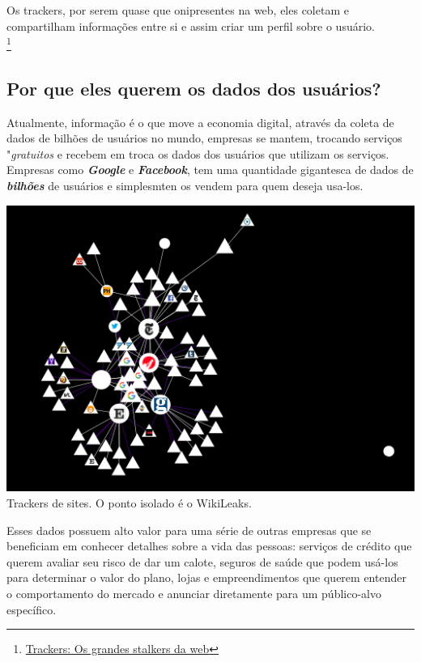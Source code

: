 \documentclass[12pt, letterpaper, Monospace:12]{report}
\begin{document}
	Os trackers, por serem quase que onipresentes na web, eles coletam e compartilham informações entre si e assim criar um perfil sobre o usuário.\\

\footnote{\href{https://antivigilancia.org/pt/2015/11/trackers-os-grandes-stalkers-da-web/}{Trackers: Os grandes stalkers da web}}

\subsection{Por que eles querem os dados dos usuários?}
	Atualmente, informação é o que move a economia digital, através da coleta de dados de bilhões de usuários no mundo, empresas se mantem, trocando serviços "\textit{gratuitos} e recebem em troca os dados dos usuários que utilizam os serviços. Empresas como \textbf{\textit{Google}} e \textbf{\textit{Facebook}}, tem uma quantidade gigantesca de dados de \textbf{\textit{bilhões}} de usuários e simplesmten os vendem para quem deseja usa-los.\\

	\begin{center} %
		\includegraphics[scale=0.7]{trackers1.png}\\
		\footnotesize Trackers de sites. O ponto isolado é o WikiLeaks.
	\end{center}


	Esses dados possuem alto valor para uma série de outras empresas que se beneficiam em conhecer detalhes sobre a vida das pessoas: serviços de crédito que querem avaliar seu risco de dar um calote, seguros de saúde que podem usá-los para determinar o valor do plano, lojas e empreendimentos que querem entender o comportamento do mercado e anunciar diretamente para um público-alvo específico.\\
\end{document}
